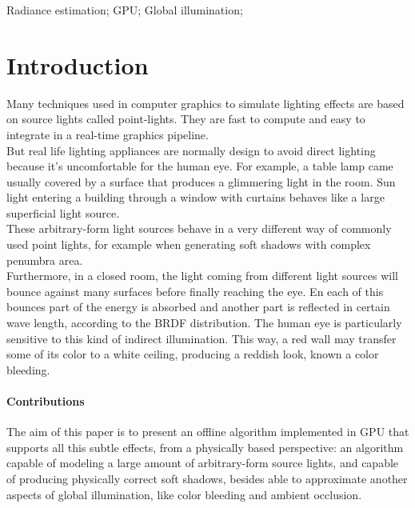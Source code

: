 \documentclass[10pt, conference]{IEEEtran}
\begin{document}
\begin{IEEEkeywords}
Radiance estimation; GPU; Global illumination;
\end{IEEEkeywords}


\IEEEpeerreviewmaketitle





\section{Introduction}
%
Many techniques used in computer graphics to simulate lighting effects are based on source lights called point-lights. 
They are fast to compute and easy to integrate in a real-time graphics pipeline.\\

But real life lighting appliances are normally design to avoid direct lighting because it’s uncomfortable for the human eye. 
For example, a table lamp came usually covered by a surface that produces a glimmering light in the room. 
Sun light entering a building through a window with curtains behaves like a large superficial light source.\\

These arbitrary-form light sources behave in a very different way of commonly used point lights, 
for example when generating soft shadows with complex penumbra area.\\

Furthermore, in a closed room, the light coming from different light sources will bounce against many surfaces before finally reaching the eye. 
En each of this bounces part of the energy is absorbed and another part is reflected in certain wave length, 
according to the BRDF \cite{brdf} distribution. The human eye is particularly sensitive to this kind of indirect illumination. 
This way, a red wall may transfer some of its color to a white ceiling, producing a reddish look, known a color bleeding.\\


\paragraph*{Contributions}
%
The aim of this paper is to present an offline algorithm implemented in GPU that supports all this subtle effects, 
from a physically based perspective: an algorithm capable of modeling a large amount of arbitrary-form source lights, 
and capable of producing physically correct soft shadows,  besides able to approximate another aspects of global illumination, 
like color bleeding and ambient occlusion. 
\end{document}
